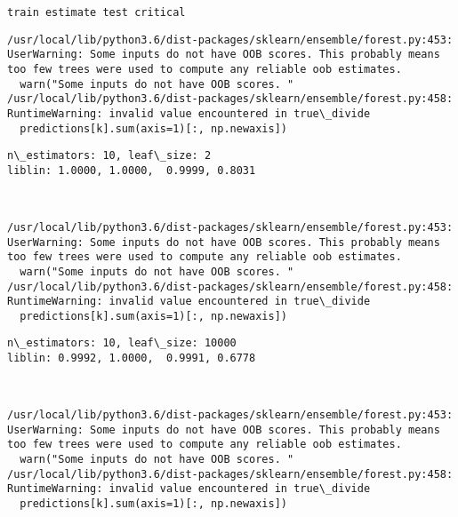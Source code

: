 \documentclass[11pt]{article}
\begin{document}
    \begin{Verbatim}[commandchars=\\\{\}]
train estimate test critical

    \end{Verbatim}

    \begin{Verbatim}[commandchars=\\\{\}]
/usr/local/lib/python3.6/dist-packages/sklearn/ensemble/forest.py:453: UserWarning: Some inputs do not have OOB scores. This probably means too few trees were used to compute any reliable oob estimates.
  warn("Some inputs do not have OOB scores. "
/usr/local/lib/python3.6/dist-packages/sklearn/ensemble/forest.py:458: RuntimeWarning: invalid value encountered in true\_divide
  predictions[k].sum(axis=1)[:, np.newaxis])

    \end{Verbatim}

    \begin{Verbatim}[commandchars=\\\{\}]
n\_estimators: 10, leaf\_size: 2
liblin: 1.0000, 1.0000,  0.9999, 0.8031 



    \end{Verbatim}

    \begin{Verbatim}[commandchars=\\\{\}]
/usr/local/lib/python3.6/dist-packages/sklearn/ensemble/forest.py:453: UserWarning: Some inputs do not have OOB scores. This probably means too few trees were used to compute any reliable oob estimates.
  warn("Some inputs do not have OOB scores. "
/usr/local/lib/python3.6/dist-packages/sklearn/ensemble/forest.py:458: RuntimeWarning: invalid value encountered in true\_divide
  predictions[k].sum(axis=1)[:, np.newaxis])

    \end{Verbatim}

    \begin{Verbatim}[commandchars=\\\{\}]
n\_estimators: 10, leaf\_size: 10000
liblin: 0.9992, 1.0000,  0.9991, 0.6778 



    \end{Verbatim}

    \begin{Verbatim}[commandchars=\\\{\}]
/usr/local/lib/python3.6/dist-packages/sklearn/ensemble/forest.py:453: UserWarning: Some inputs do not have OOB scores. This probably means too few trees were used to compute any reliable oob estimates.
  warn("Some inputs do not have OOB scores. "
/usr/local/lib/python3.6/dist-packages/sklearn/ensemble/forest.py:458: RuntimeWarning: invalid value encountered in true\_divide
  predictions[k].sum(axis=1)[:, np.newaxis])

    \end{Verbatim}
\end{document}
